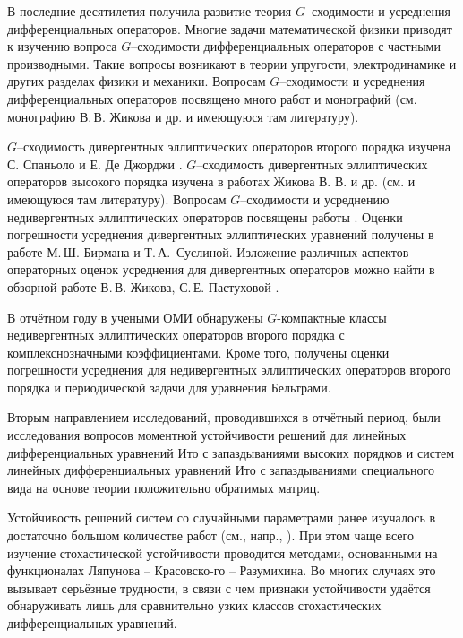\Introduction




В последние десятилетия получила развитие теория $G$--сходимости и усреднения дифференциальных
операторов. Многие задачи математической
физики приводят к изучению вопроса $G$--сходимости дифференциальных
операторов с частными производными. Такие вопросы возникают в теории упругости,
электродинамике и других разделах физики и механики. Вопросам
$G$--сходимости и усреднения дифференциальных
операторов посвящено много работ и монографий (см. монографию В.\,В. Жикова и др.
\cite{smm_ZhKO} и имеющуюся там литературу).

$G$--сходимость дивергентных эллиптических операторов второго порядка изучена
С. Спаньоло и Е. Де Джорджи \cite{smm_Dg1, smm_Dg2, smm_Dg3}.
$G$--сходимость дивергентных эллиптических операторов высокого порядка изучена в
работах Жикова В. В. и др. (см. \cite{smm_ZhKO} и имеющуюся там литературу).
Вопросам $G$--сходимости и усреднению недивергентных эллиптических операторов
посвящены работы \cite{smm_ZhS, smm_ZhS1, smm_Sir1,smm_Sir}.
Оценки погрешности усреднения  дивергентных эллиптических уравнений  получены в работе  \cite{smm_Sus} М.\,Ш. Бирмана и
  Т.\,А.~Суслиной.
Изложение различных аспектов операторных оценок усреднения для дивергентных
операторов можно найти в обзорной работе В.\,В. Жикова,
С.\,Е. Пастуховой  \cite{smm_VP}.

В отчётном году в учеными ОМИ обнаружены $G$-компактные классы недивергентных эллиптических операторов второго порядка с комплекснозначными коэффициентами.
Кроме того, получены оценки погрешности усреднения для недивергентных
эллиптических операторов второго порядка и периодической задачи для уравнения Бельтрами.



Вторым направлением исследований, проводившихся в отчётный период, были исследования вопросов моментной устойчивости решений для линейных дифференциальных уравнений Ито с запаздываниями высоких порядков и систем линейных дифференциальных уравнений Ито с запаздываниями специального вида на основе теории положительно обратимых матриц.

Устойчивость решений систем со случайными параметрами ранее изучалось в достаточно большом количестве работ (см., напр., \cite{kri-bib-1, kri-bib-2, kri-bib-3, kri-bib-4}). При этом чаще всего изучение стохастической устойчивости проводится методами, основанными на функционалах Ляпунова -- Красовско-\linebreak го -- Разумихина.
Во многих случаях это вызывает серьёзные трудности, в связи с чем признаки устойчивости удаётся обнаруживать лишь для сравнительно узких классов стохастических дифференциальных уравнений.

